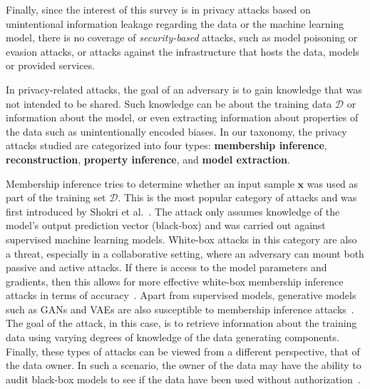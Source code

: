 Finally, since the interest of this survey is in privacy attacks based on unintentional information leakage regarding the data or the machine learning model, there is no coverage of \textit{security-based} attacks, such as model poisoning or evasion attacks, or attacks against the infrastructure that hosts the data, models or provided services.

\label{sec:taxonomy}
In privacy-related attacks, the goal of an adversary is to gain knowledge that was not intended to be shared. Such knowledge can be about the training data $\mathcal{D}$ or information about the model, or even extracting information about properties of the data such as unintentionally encoded biases. In our taxonomy, the privacy attacks studied are categorized into four types: \textbf{membership inference}, \textbf{reconstruction}, \textbf{property inference}, and \textbf{model extraction}.

\label{subsec:mi_attacks}
Membership inference tries to determine whether an input sample $\mathbf{x}$ was used as part of the training set $\mathcal{D}$. This is the most popular category of attacks and was first introduced by Shokri et al.~. The attack only assumes knowledge of the model's output prediction vector (black-box) and was carried out against supervised machine learning models. White-box attacks in this category are also a threat, especially in a collaborative setting, where an adversary can mount both passive and active attacks. If there is access to the model parameters and gradients, then this allows for more effective white-box membership inference attacks in terms of accuracy~. 
Apart from supervised models, generative models such as GANs and VAEs are also susceptible to membership inference attacks~. The goal of the attack, in this case, is to retrieve information about the training data using varying degrees of knowledge of the data generating components.
Finally, these types of attacks can be viewed from a different perspective, that of the data owner. In such a scenario, the owner of the data may have the ability to audit black-box models to see if the data have been used without authorization~.

